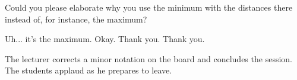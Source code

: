 \begin{student-interaction}
Could you please elaborate why you use the minimum with the distances there instead of, for instance, the maximum?
\end{student-interaction}

\begin{spoken-clean}[00:28:12 - 00:28:47]
 Uh... it's the maximum. Okay. Thank you.  Thank you. 
\end{spoken-clean}

\begin{meta-note}
The lecturer corrects a minor notation on the board and concludes the session. The students applaud as he prepares to leave.
\end{meta-note}